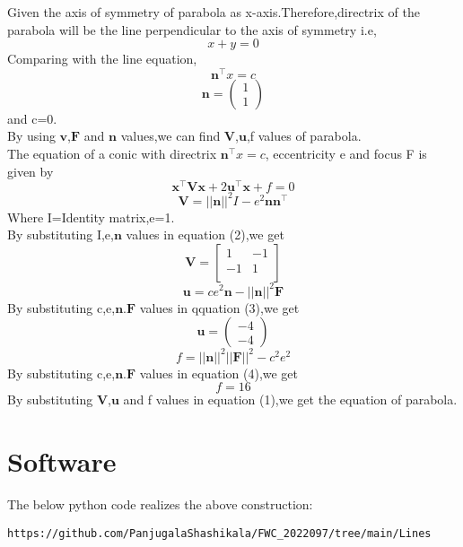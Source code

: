 \documentclass[10pt, a4paper]{article}
\newcommand{\myvec}[1]{\ensuremath{\begin{pmatrix}#1\end{pmatrix}}}
\let\vec\mathbf
\begin{document}
Given the axis of symmetry of parabola as x-axis.Therefore,directrix of the parabola will be the line perpendicular to the axis of symmetry i.e, $$ x+y=0 $$
Comparing with the line equation,$$\vec{n}^{\top}x=c$$
$$\vec{n}=\myvec{1 \\ 1}$$
and c=0.\\
By using $\vec{v}$,$\vec{F}$ and $\vec{n}$ values,we can find $\vec{V}$,$\vec{u}$,f values of parabola.\\
The equation of a conic with directrix $\vec{n}^{\top}x=c$, eccentricity e and focus F is given by
\begin{equation}
\vec{x}^{\top}\vec{V}\vec{x}+2\vec{u}^{\top}\vec{x}+f=0
\end{equation}
\begin{equation}
\vec{V}=||\vec{n}||^2I-e^2\vec{n}\vec{n}^{\top}
\end{equation}
Where I=Identity matrix,e=1.\\ 
By substituting I,e,$\vec{n}$ values in equation (2),we get
$$
\vec{V}=
\begin{bmatrix}
1 & -1 \\
-1 & 1\\
\end{bmatrix}
$$
\begin{equation}
\vec{u}=ce^2\vec{n}-||\vec{n}||^2\vec{F}
\end{equation}
By substituting c,e,$\vec{n}$.$\vec{F}$ values in qquation (3),we get
$$\vec{u}=\myvec{ -4 \\ -4 }$$
\begin{equation}
f=||\vec{n}||^2||\vec{F}||^2-c^2e^2
\end{equation}
By substituting c,e,$\vec{n}$.$\vec{F}$ values in equation (4),we get\\
$$f=16$$
\vspace{0.5cm}
By substituting $\vec{V}$,$\vec{u}$ and f values in equation (1),we get the equation of parabola.\\
\vspace{0.5cm}




\section{Software}


The below python code realizes the above construction:	\\
\begin{lstlisting}
https://github.com/PanjugalaShashikala/FWC_2022097/tree/main/Lines
 \end{lstlisting}
\end{document}
